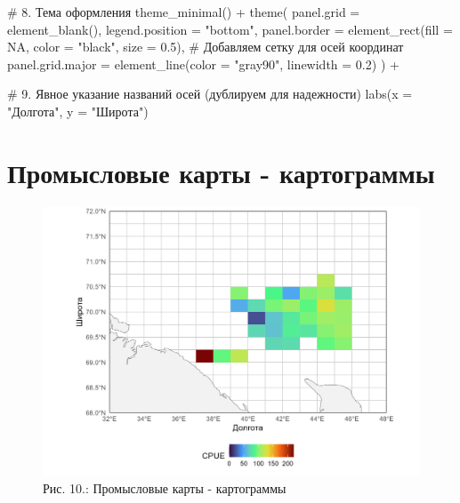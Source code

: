 \documentclass[
  letterpaper,
  DIV=11,
  numbers=noendperiod]{scrreprt}
\newenvironment{Shaded}{\begin{snugshade}}{\end{snugshade}}
\newcommand{\AttributeTok}[1]{\textcolor[rgb]{0.40,0.45,0.13}{#1}}
\newcommand{\CommentTok}[1]{\textcolor[rgb]{0.37,0.37,0.37}{#1}}
\newcommand{\ConstantTok}[1]{\textcolor[rgb]{0.56,0.35,0.01}{#1}}
\newcommand{\FloatTok}[1]{\textcolor[rgb]{0.68,0.00,0.00}{#1}}
\newcommand{\FunctionTok}[1]{\textcolor[rgb]{0.28,0.35,0.67}{#1}}
\newcommand{\NormalTok}[1]{\textcolor[rgb]{0.00,0.23,0.31}{#1}}
\newcommand{\SpecialCharTok}[1]{\textcolor[rgb]{0.37,0.37,0.37}{#1}}
\newcommand{\StringTok}[1]{\textcolor[rgb]{0.13,0.47,0.30}{#1}}
\begin{document}
\begin{Shaded}
\begin{Highlighting}[]
  \CommentTok{\# 8. Тема оформления}
  \FunctionTok{theme\_minimal}\NormalTok{() }\SpecialCharTok{+}
  \FunctionTok{theme}\NormalTok{(}
    \AttributeTok{panel.grid =} \FunctionTok{element\_blank}\NormalTok{(),}
    \AttributeTok{legend.position =} \StringTok{"bottom"}\NormalTok{,}
    \AttributeTok{panel.border =} \FunctionTok{element\_rect}\NormalTok{(}\AttributeTok{fill =} \ConstantTok{NA}\NormalTok{, }\AttributeTok{color =} \StringTok{"black"}\NormalTok{, }\AttributeTok{size =} \FloatTok{0.5}\NormalTok{),}
    \CommentTok{\# Добавляем сетку для осей координат}
    \AttributeTok{panel.grid.major =} \FunctionTok{element\_line}\NormalTok{(}\AttributeTok{color =} \StringTok{"gray90"}\NormalTok{, }\AttributeTok{linewidth =} \FloatTok{0.2}\NormalTok{)}
\NormalTok{  ) }\SpecialCharTok{+}
  
  \CommentTok{\# 9. Явное указание названий осей (дублируем для надежности)}
  \FunctionTok{labs}\NormalTok{(}\AttributeTok{x =} \StringTok{"Долгота"}\NormalTok{, }\AttributeTok{y =} \StringTok{"Широта"}\NormalTok{)}
\end{Highlighting}
\end{Shaded}

\section{Промысловые карты -
картограммы}\label{ux43fux440ux43eux43cux44bux441ux43bux43eux432ux44bux435-ux43aux430ux440ux442ux44b---ux43aux430ux440ux442ux43eux433ux440ux430ux43cux43cux44b}

\begin{figure}[H]

{\centering \includegraphics[width=0.8\linewidth,height=\textheight,keepaspectratio]{images/KARTOGRAPH10.jpg}

}

\caption{Рис. 10.: Промысловые карты - картограммы}

\end{figure}%
\end{document}
